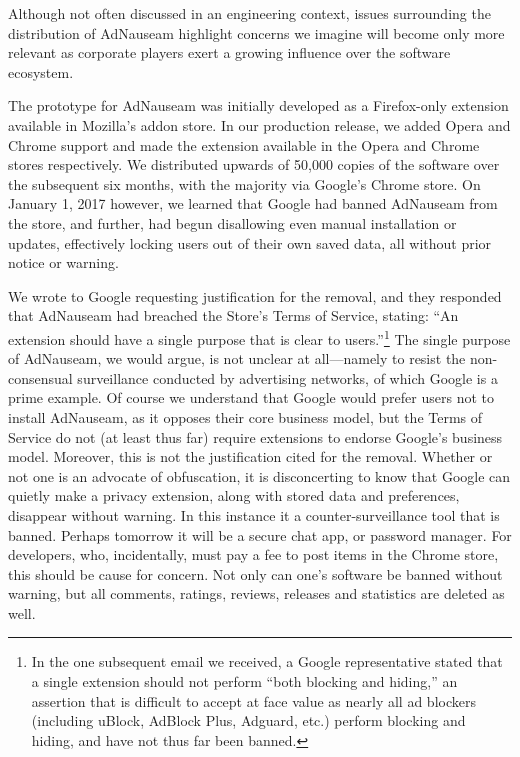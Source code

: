 \documentclass[conference]{IEEEtran}
\begin{document}
Although not often discussed in an engineering context, issues surrounding the distribution of AdNauseam highlight concerns we imagine will become only more relevant as corporate players exert a growing influence over the software ecosystem.

The prototype for AdNauseam was initially developed as a Firefox-only extension available in  Mozilla's addon store. In our production release, we added Opera and Chrome support and made the extension available in the Opera and Chrome stores respectively. We distributed upwards of 50,000 copies of the software over the subsequent six months, with the majority via Google's Chrome store. On January 1, 2017 however, we learned that Google had banned AdNauseam from the store, and further, had begun disallowing even manual installation or updates, effectively locking users out of their own saved data, all without prior notice or warning.

We wrote to Google requesting justification for the removal, and they responded that AdNauseam had breached the Store's Terms of Service, stating: “An extension should have a single purpose that is clear to users.”\footnote{In the one subsequent email we received, a Google representative stated that a single extension should not perform “both blocking and hiding,” an assertion that is difficult to accept at face value as nearly all ad blockers (including uBlock, AdBlock Plus, Adguard, etc.) perform blocking and hiding, and have not thus far been banned.} The single purpose of AdNauseam, we would argue, is not unclear at all---namely to resist the non-consensual surveillance conducted by advertising networks, of which Google is a prime example. Of course we understand that Google would prefer users not to install AdNauseam, as it opposes their core business model, but the Terms of Service do not (at least thus far) require extensions to endorse Google's business model. Moreover, this is not the justification cited for the removal. Whether or not one is an advocate of obfuscation, it is disconcerting to know that Google can quietly make a privacy extension, along with stored data and preferences, disappear without warning. In this instance it a counter-surveillance tool that is banned. Perhaps tomorrow it will be a secure chat app, or password manager. For developers, who, incidentally, must pay a fee to post items in the Chrome store, this should be cause for concern. Not only can one's software be banned without warning, but all comments, ratings, reviews, releases and statistics are deleted as well.
\end{document}
